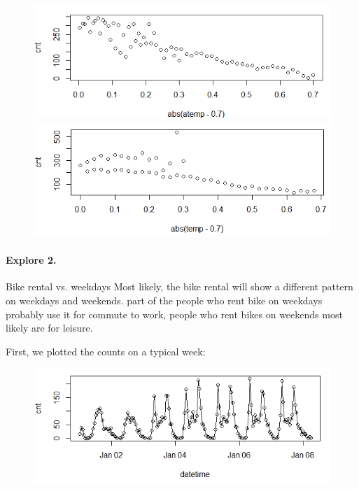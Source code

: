 \documentclass[12pt]{article}
\begin{document}
	\begin{figure}[H]
		\centering
		\begin{minipage}{.45\textwidth}
			\centering
			\includegraphics[width=\linewidth]{figures/atemp_abs.png}
		\end{minipage}%
		\begin{minipage}{.45\textwidth}
			\centering
			\includegraphics[width=\linewidth]{figures/temp_abs.png}
		\end{minipage}
	\end{figure}
	
	\paragraph*{Explore 2.} Bike rental vs. weekdays
	Most likely, the bike rental will show a different pattern on weekdays and weekends. part of the people who rent bike on weekdays probably use it for commute to work, people who rent bikes on weekends most likely are for leisure.
	
	First, we plotted the counts on a typical week:
	\begin{figure}[H]
		\centering
		\includegraphics[scale=.8]{figures/week_cnt.png}
	\end{figure}
	
\end{document}

